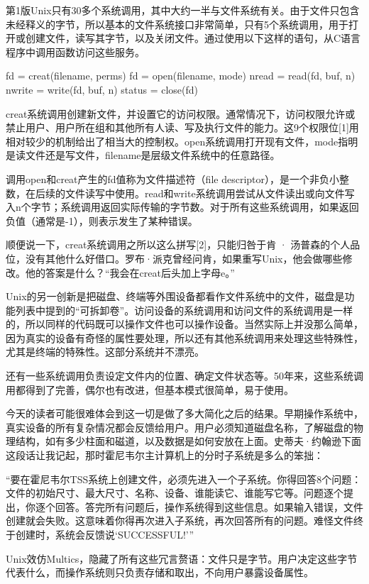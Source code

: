 \documentclass[a4paper,12pt,UTF8,twoside]{ctexbook}
\begin{document}
{第1版Unix只有30多个系统调用，其中大约一半与文件系统有关。由于文件只包含未经释义的字节，所以基本的文件系统接口非常简单，只有5个系统调用，用于打开或创建文件，读写其字节，以及关闭文件。通过使用以下这样的语句，从C语言程序中调用函数访问这些服务。

fd = creat(filename, perms) fd = open(filename, mode) nread = read(fd, buf, n) nwrite = write(fd, buf, n) status = close(fd)

creat系统调用创建新文件，并设置它的访问权限。通常情况下，访问权限允许或禁止用户、用户所在组和其他所有人读、写及执行文件的能力。这9个权限位[1]用相对较少的机制给出了相当大的控制权。open系统调用打开现有文件，mode指明是读文件还是写文件，filename是层级文件系统中的任意路径。

调用open和creat产生的fd值称为文件描述符（file descriptor），是一个非负小整数，在后续的文件读写中使用。read和write系统调用尝试从文件读出或向文件写入n个字节；系统调用返回实际传输的字节数。对于所有这些系统调用，如果返回负值（通常是-1），则表示发生了某种错误。

顺便说一下，creat系统调用之所以这么拼写[2]，只能归咎于肯 · 汤普森的个人品位，没有其他什么好借口。罗布·派克曾经问肯，如果重写Unix，他会做哪些修改。他的答案是什么？“我会在creat后头加上字母e。”

Unix的另一创新是把磁盘、终端等外围设备都看作文件系统中的文件，磁盘是功能列表中提到的“可拆卸卷”。访问设备的系统调用和访问文件的系统调用是一样的，所以同样的代码既可以操作文件也可以操作设备。当然实际上并没那么简单，因为真实的设备有奇怪的属性要处理，所以还有其他系统调用来处理这些特殊性，尤其是终端的特殊性。这部分系统并不漂亮。

还有一些系统调用负责设定文件内的位置、确定文件状态等。50年来，这些系统调用都得到了完善，偶尔也有改进，但基本模式很简单，易于使用。

今天的读者可能很难体会到这一切是做了多大简化之后的结果。早期操作系统中，真实设备的所有复杂情况都会反馈给用户。用户必须知道磁盘名称，了解磁盘的物理结构，如有多少柱面和磁道，以及数据是如何安放在上面。史蒂夫·约翰逊下面这段话让我记起，那时霍尼韦尔主计算机上的分时子系统是多么的笨拙：

“要在霍尼韦尔TSS系统上创建文件，必须先进入一个子系统。你得回答8个问题：文件的初始尺寸、最大尺寸、名称、设备、谁能读它、谁能写它等。问题逐个提出，你逐个回答。答完所有问题后，操作系统得到这些信息。如果输入错误，文件创建就会失败。这意味着你得再次进入子系统，再次回答所有的问题。难怪文件终于创建时，系统会反馈说‘SUCCESSFUL!’”



Unix效仿Multics，隐藏了所有这些冗言赘语：文件只是字节。用户决定这些字节代表什么，而操作系统则只负责存储和取出，不向用户暴露设备属性。





}
\end{document}
